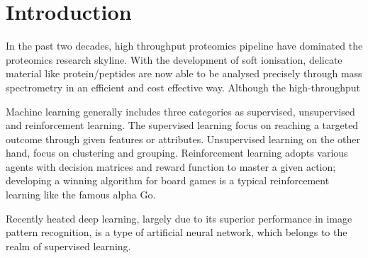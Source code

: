 \section{Introduction}

In the past two decades, high throughput proteomics pipeline have dominated the proteomics research skyline. With the development of soft ionisation, delicate material like protein/peptides are now able to be analysed precisely through mass spectrometry in an efficient and cost effective way. Although the high-throughput   
\par 
Machine learning generally includes three categories as supervised, unsupervised and reinforcement learning. The supervised learning focus on reaching a targeted outcome through given features or attributes. Unsupervised learning on the other hand, focus on clustering and grouping. Reinforcement learning adopts various agents with decision matrices and reward function to master a given action; developing a winning algorithm for board games is a typical reinforcement learning like the famous alpha Go.
\par
Recently heated deep learning, largely due to its superior performance in image pattern recognition, is a type of artificial neural network, which belongs to the realm of supervised learning. 
